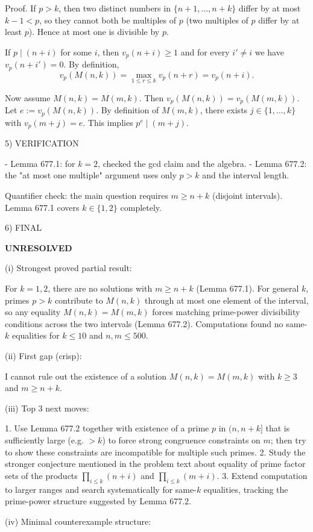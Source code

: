 Proof.
If $p>k$, then two distinct numbers in $\{n+1,\dots,n+k\}$ differ by at most $k-1<p$, so they cannot both be multiples of $p$ (two multiples of $p$ differ by at least $p$). Hence at most one is divisible by $p$.

If $p\mid(n+i)$ for some $i$, then $v_p(n+i)\ge 1$ and for every $i'\ne i$ we have $v_p(n+i')=0$. By definition,
\[
 v_p(M(n,k))=\max_{1\le r\le k} v_p(n+r)=v_p(n+i).
\]

Now assume $M(n,k)=M(m,k)$. Then $v_p(M(n,k))=v_p(M(m,k))$. Let $e:=v_p(M(n,k))$. By definition of $M(m,k)$, there exists $j\in\{1,\dots,k\}$ with $v_p(m+j)=e$. This implies $p^e\mid(m+j)$.


5) VERIFICATION

- Lemma 677.1: for $k=2$, checked the gcd claim and the algebra.
- Lemma 677.2: the "at most one multiple" argument uses only $p>k$ and the interval length.

Quantifier check: the main question requires $m\ge n+k$ (disjoint intervals). Lemma 677.1 covers $k\in\{1,2\}$ completely.

6) FINAL

\textbf{UNRESOLVED}

(i) Strongest proved partial result:

For $k=1,2$, there are no solutions with $m\ge n+k$ (Lemma 677.1). For general $k$, primes $p>k$ contribute to $M(n,k)$ through at most one element of the interval, so any equality $M(n,k)=M(m,k)$ forces matching prime-power divisibility conditions across the two intervals (Lemma 677.2). Computations found no same-$k$ equalities for $k\le 10$ and $n,m\le 500$.

(ii) First gap (crisp):

I cannot rule out the existence of a solution $M(n,k)=M(m,k)$ with $k\ge 3$ and $m\ge n+k$.

(iii) Top 3 next moves:

1. Use Lemma 677.2 together with existence of a prime $p$ in $(n, n+k]$ that is sufficiently large (e.g. $>k$) to force strong congruence constraints on $m$; then try to show these constraints are incompatible for multiple such primes.
2. Study the stronger conjecture mentioned in the problem text about equality of prime factor sets of the products $\prod_{i\le k}(n+i)$ and $\prod_{i\le k}(m+i)$.
3. Extend computation to larger ranges and search systematically for same-$k$ equalities, tracking the prime-power structure suggested by Lemma 677.2.

(iv) Minimal counterexample structure:

